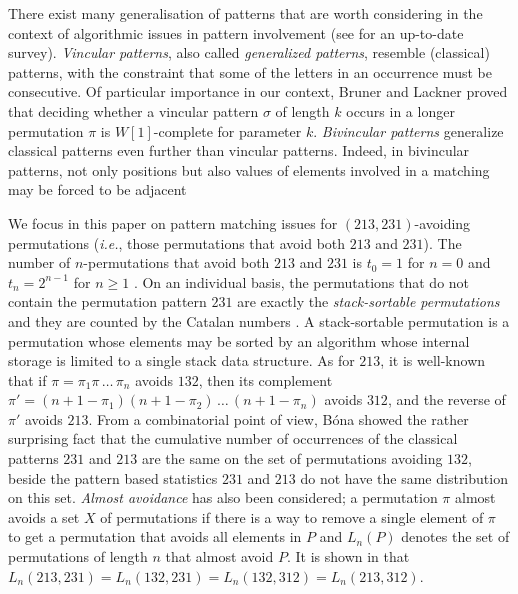 \documentclass[a4paper]{llncs}
\newcounter{num}
\begin{document}
	There exist many generalisation of patterns that are worth considering
	in the context of algorithmic issues in pattern involvement
	(see \cite{Kitaev:book:2011} for an up-to-date survey).
	\emph{Vincular patterns}, also called
	\emph{generalized patterns},
	resemble (classical) patterns, with the constraint that some of the letters in
	an occurrence must be consecutive.
	Of particular importance in our context,
	Bruner and Lackner \cite{Bruner:Lackner:SWAT:2012}
	proved that deciding whether a vincular pattern
	$\sigma$ of length $k$ occurs in a longer permutation
	$\pi$ is $W[1]$-complete for
	parameter $k$.
	\emph{Bivincular patterns} generalize classical patterns even further
	than vincular
	patterns. Indeed, in bivincular patterns,
	not only positions but also values
	of elements involved in a matching may be forced to be adjacent

	We focus in this paper on pattern matching issues for
	$(213,231)$-avoiding permutations
    (\emph{i.e.}, those permutations that avoid both $213$ and $231$).
	The number of $n$-permutations that avoid both
	$213$ and $231$ is
	$t_0 = 1$ for $n = 0$ and
	$t_n =2^{n-1}$ for $n\geq 1$ \cite{Simion:Schmidt:EJC:1985}.
	On an individual basis,
	the permutations that do not contain the permutation pattern $231$
	are exactly the \emph{stack-sortable permutations} and they are counted by
	the Catalan numbers \cite{Knuth:1997:ACP:260999}.
	A stack-sortable permutation is a permutation whose elements may be sorted by
	an algorithm whose internal storage is limited to a single stack data structure.
	As for $213$, it is well-known that
 	if $\pi = \pi_1\pi\,\ldots\,\pi_n$ avoids $132$, then its complement
 	$\pi' = (n+1-\pi_1)(n+1-\pi_2)\,\ldots\,(n+1-\pi_n)$ avoids $312$, and
 	the reverse of $\pi'$ avoids $213$.
 	From a combinatorial point of view,
 	B\'ona \cite{Bona:ElJC:2012}
 	showed the rather surprising fact that the cumulative number of
 	occurrences of the classical patterns $231$ and $213$ are the same on the
 	set of permutations avoiding $132$,
 	beside the pattern based statistics $231$ and $213$
 	do not have the same distribution on this set.
 	\emph{Almost avoidance} has also been considered;
 	a permutation $\pi$ almost avoids a set $X$ of permutations
 	if there is a way to remove a single element of $\pi$ to get a permutation
 	that avoids all elements in $P$
 	and $L_n(P)$ denotes the set of permutations of length $n$ that almost avoid
 	$P$.
 	It is shown in \cite{Griffiths:Smith:Warren:PMA:2011} that
 	$L_n(213, 231) = L_n(132, 231) = L_n(132, 312) = L_n(213, 312)$.
\end{document}
